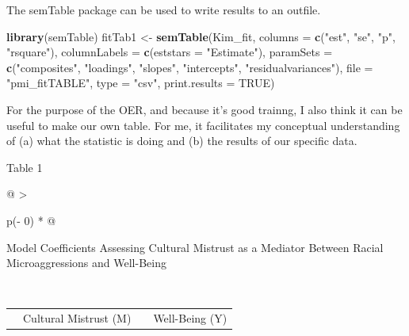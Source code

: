 \documentclass[
  11pt,
]{book}
\newenvironment{Shaded}{\begin{snugshade}}{\end{snugshade}}
\newcommand{\AttributeTok}[1]{\textcolor[rgb]{0.27,0.27,0.27}{#1}}
\newcommand{\ConstantTok}[1]{\textcolor[rgb]{0.37,0.37,0.37}{#1}}
\newcommand{\FunctionTok}[1]{\textcolor[rgb]{0.27,0.27,0.27}{\textbf{#1}}}
\newcommand{\NormalTok}[1]{#1}
\newcommand{\OtherTok}[1]{\textcolor[rgb]{0.37,0.37,0.37}{#1}}
\newcommand{\StringTok}[1]{\textcolor[rgb]{0.5,0.5,0.5}{#1}}
\begin{document}
The semTable package can be used to write results to an outfile.

\begin{Shaded}
\begin{Highlighting}[]
\FunctionTok{library}\NormalTok{(semTable)}
\NormalTok{fitTab1 }\OtherTok{\textless{}{-}} \FunctionTok{semTable}\NormalTok{(Kim\_fit, }\AttributeTok{columns =} \FunctionTok{c}\NormalTok{(}\StringTok{"est"}\NormalTok{, }\StringTok{"se"}\NormalTok{, }\StringTok{"p"}\NormalTok{, }\StringTok{"rsquare"}\NormalTok{),  }\AttributeTok{columnLabels =} \FunctionTok{c}\NormalTok{(}\AttributeTok{eststars =} \StringTok{"Estimate"}\NormalTok{), }\AttributeTok{paramSets =} \FunctionTok{c}\NormalTok{(}\StringTok{"composites"}\NormalTok{, }\StringTok{"loadings"}\NormalTok{, }\StringTok{"slopes"}\NormalTok{, }\StringTok{"intercepts"}\NormalTok{, }\StringTok{"residualvariances"}\NormalTok{), }\AttributeTok{file =} \StringTok{"pmi\_fitTABLE"}\NormalTok{, }\AttributeTok{type =} \StringTok{"csv"}\NormalTok{, }\AttributeTok{print.results =} \ConstantTok{TRUE}\NormalTok{)}
\end{Highlighting}
\end{Shaded}

For the purpose of the OER, and because it's good trainng, I also think it can be useful to make our own table. For me, it facilitates my conceptual understanding of (a) what the statistic is doing and (b) the results of our specific data.

Table 1

\begin{longtable}[]{@{}
  >{\raggedright\arraybackslash}p{(\columnwidth - 0\tabcolsep) * }@{}}
\toprule\noalign{}
\begin{minipage}[b]{\linewidth}\raggedright
Model Coefficients Assessing Cultural Mistrust as a Mediator Between Racial Microaggressions and Well-Being
\end{minipage} \\
\midrule\noalign{}
\endhead
\bottomrule\noalign{}
\endlastfoot
\end{longtable}

\begin{longtable}[]{@{}
  >{\raggedright\arraybackslash}p{}
  >{\centering\arraybackslash}p{}
  >{\centering\arraybackslash}p{}
  >{\centering\arraybackslash}p{}@{}}
\toprule\noalign{}
\endhead
\bottomrule\noalign{}
\endlastfoot
& Cultural Mistrust (M) & & Well-Being (Y) \\
\end{longtable}
\end{document}
